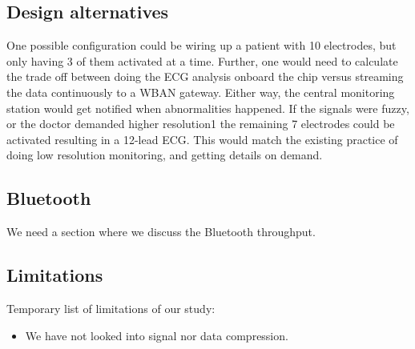 
\subsection{Design alternatives} %
\label{sub:design_alternatives}

One possible configuration could be wiring up a patient with 10 electrodes, but only having 3 of them activated at a time. Further, one would need to calculate the trade off between doing the ECG analysis onboard the chip versus streaming the data continuously to a WBAN gateway. Either way, the central monitoring station would get notified when abnormalities happened. If the signals were fuzzy, or the doctor demanded higher resolution{1} the remaining 7 electrodes could be activated resulting in a 12-lead ECG. This would match the existing practice of doing low resolution monitoring, and getting details on demand.


\subsection{Bluetooth} %
\label{sub:bluetooth}

We need a section where we discuss the Bluetooth throughput.


\subsection{Limitations} %
\label{sub:limitations}

Temporary list of limitations of our study:

\begin{itemize}

  \item We have not looked into signal nor data compression.

\end{itemize}


